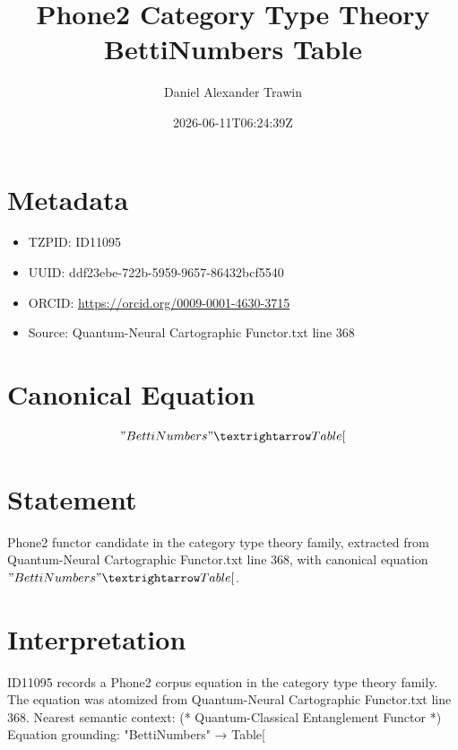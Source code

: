\documentclass[11pt]{article}
\title{Phone2 Category Type Theory BettiNumbers Table}
\author{Daniel Alexander Trawin}
\date{2026-06-11T06:24:39Z}
\begin{document}
\maketitle
\section*{Metadata}
\begin{itemize}
\item TZPID: ID11095
\item UUID: ddf23ebe-722b-5959-9657-86432bcf5540
\item ORCID: \url{https://orcid.org/0009-0001-4630-3715}
\item Source: Quantum-Neural Cartographic Functor.txt line 368
\end{itemize}
\section*{Canonical Equation}
\[
"BettiNumbers" → Table[
\]
\section*{Statement}
Phone2 functor candidate in the category type theory family, extracted from Quantum-Neural Cartographic Functor.txt line 368, with canonical equation $"BettiNumbers" → Table[$.
\section*{Interpretation}
ID11095 records a Phone2 corpus equation in the category type theory family. The equation was atomized from Quantum-Neural Cartographic Functor.txt line 368. Nearest semantic context: (* Quantum-Classical Entanglement Functor *) Equation grounding: "BettiNumbers" → Table[
\end{document}
